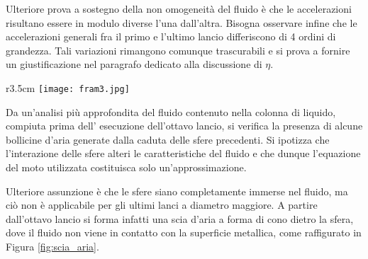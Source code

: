 \documentclass[a4paper,11pt,oneside]{article}
\begin{document}
Ulteriore prova a sostegno della non omogeneità del fluido è che le accelerazioni risultano essere in modulo diverse l'una dall'altra.
Bisogna osservare infine che le accelerazioni generali fra il primo e l'ultimo lancio differiscono di 4 ordini di grandezza. Tali variazioni rimangono comunque trascurabili e si prova a fornire un giustificazione nel paragrafo dedicato alla discussione di $\eta$.\newline


 \begin{wrapfigure}{r}{3.5cm}
    \centering
    \vspace{0.5cm}
    \texttt{[image: fram3.jpg]}
    \caption{Scia d'aria}
    \label{fig:scia_aria}
\end{wrapfigure}
Da un'analisi più approfondita del fluido contenuto nella colonna di liquido, compiuta prima dell' esecuzione dell'ottavo lancio, si verifica la presenza di alcune bollicine d'aria generate dalla caduta delle sfere precedenti. Si ipotizza che l'interazione delle sfere alteri le caratteristiche del fluido e che dunque l'equazione del moto utilizzata costituisca solo un'approssimazione.



Ulteriore assunzione è che le sfere siano completamente immerse nel fluido, ma ciò non è applicabile per gli ultimi lanci a diametro maggiore. A partire dall'ottavo lancio si forma infatti una scia d'aria a forma di cono dietro la sfera, dove il fluido non viene in contatto con la superficie metallica, come raffigurato in Figura \ref{fig:scia_aria}. 



\end{document}
